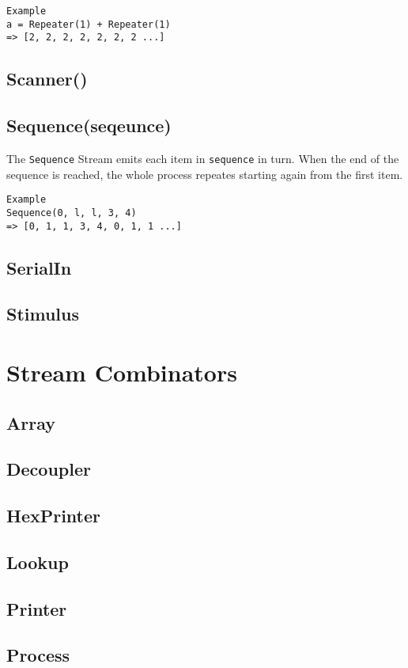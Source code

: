 \begin{verbatim}
Example
a = Repeater(1) + Repeater(1)
=> [2, 2, 2, 2, 2, 2, 2 ...]
\end{verbatim}

\subsection{Scanner()}

\subsection{Sequence(seqeunce)}
The \verb|Sequence| Stream emits each item in \verb|sequence| in turn. When the
end of the sequence is reached, the whole process repeates starting again from
the first item.

\begin{verbatim}
Example
Sequence(0, l, l, 3, 4)
=> [0, 1, 1, 3, 4, 0, 1, 1 ...]
\end{verbatim}

\subsection{SerialIn}
\subsection{Stimulus}

\section{Stream Combinators}
\subsection{Array}
\subsection{Decoupler}
\subsection{HexPrinter}
\subsection{Lookup}
\subsection{Printer}
\subsection{Process}
\label{Resizer}
